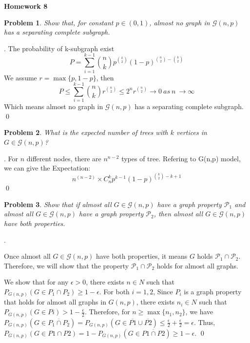 \documentclass[12pt]{article}
\date{Feb 14, 2012}
\newtheorem{hw}{Problem}
\newenvironment{sol}
  {\par\vspace{3mm}\noindent{\it Solution}.}
  {\qed}
\begin{document}
\begin{center}
{\LARGE\bf Homework 8}\\
\vspace{2mm}
\end{center}

\begin{hw}
Show that, for constant $p\in(0,1)$, almost no graph in $\mathcal{G}(n,p)$ has a separating complete subgraph.
\end{hw}

\begin{sol}
\renewcommand{\qedsymbol}{}
The probability of k-subgraph exist $$P = \sum_{i=1}^{k-1}{n\choose k}p^{k\choose 2}(1-p)^{{n\choose 2}-{k\choose 2}}$$
We assume $r=\max\{p, 1-p\}$, then
$$P \leq \sum_{i=1}^{k-1}{n\choose k}r^{n\choose 2} \leq 2^{n}r^{n\choose 2} \rightarrow 0\ as\ n\ \rightarrow \infty $$
Which means almost no graph in $\mathcal{G}(n,p)$ has a separating complete subgraph.
\end{sol}

\begin{hw}
What is the expected number of trees with $k$ vertices in $G\in \mathcal{G}(n,p)$?
\end{hw}
\begin{sol}
\renewcommand{\qedsymbol}{}
For $n$ different nodes, there are $n^{n-2}$ types of tree. 
Refering to G(n,p) model, we can give the Expectation: 
$$n^{(n-2)} \times C_n^{k}p^{k-1}(1-p)^{{k\choose 2}-k+1}$$
\end{sol}

\begin{hw}
Show that if almost all $G\in \mathcal{G}(n,p)$ have a graph property $\mathcal{P}_1$ and almost all $G\in \mathcal{G}(n,p)$ have a graph property $\mathcal{P}_2$, then almost all $G\in \mathcal{G}(n,p)$ have both properties.
\end{hw}

\begin{sol}\par
\renewcommand{\qedsymbol}{}
Once almost all $G\in \mathcal{G}(n,p)$ have both properties, it means $G$ holds $\mathcal{P}_{1} \cap \mathcal{P}_{2}$. Therefore, we will show that the property $\mathcal{P}_{1} \cap \mathcal{P}_{2}$ holds for almost all graphs.\par
We show that for any $\epsilon > 0$, there exists $n \in N$ such that $P_{G(n,p)}(G \in P_1\cap P_2) \geq 1 - \epsilon$. For both $i = 1, 2$, Since $P_i$ is a graph property that holds for almost all graphs in $G(n, p)$, there exists $n_i \in N$ such that $P_{G(n,p)}(G \in Pi) > 1 - \frac{\epsilon}{2}$. Therefore, for
$n \geq \max\{n_1, n_2\}$, we have $P_{G(n,p)}(G \in \overline{ P_1 \cap P_2 }) = P_{G(n,p)}(G \in \overline{P1} \cup \overline{P2}) \leq \frac{\epsilon}{2}+\frac{\epsilon}{2}=\epsilon$. Thus, $P_{G(n,p)}(G \in P1 \cap P2) = 1 - P_{G(n,p)}(G \in \overline{P1 \cap P2}) \geq 1- \epsilon$.
\end{sol}
\end{document}
